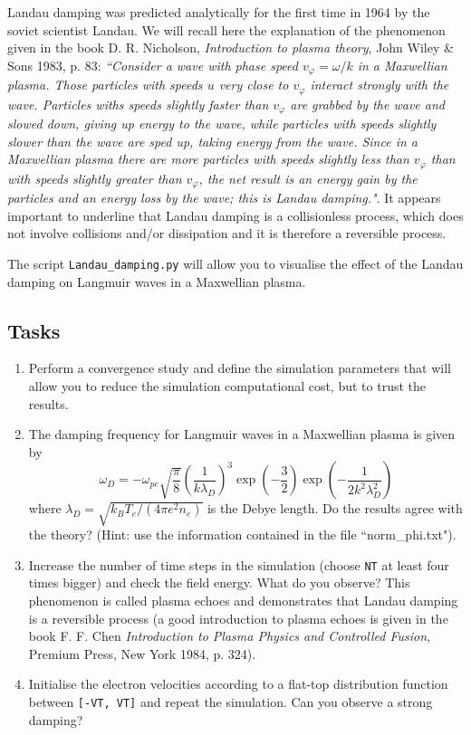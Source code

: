 \documentclass[]{exam}
\begin{document}
Landau damping was predicted analytically for the first time in 1964 by the soviet scientist Landau. We will recall here the explanation of the phenomenon given in the book D. R. Nicholson, \textit{Introduction to plasma theory}, John Wiley \& Sons 1983, p. 83: \textit{``Consider a wave with phase speed $v_{\varphi}=\omega/k$ in a Maxwellian plasma. Those particles with speeds $u$ very close to $v_{\varphi}$ interact strongly with the wave. Particles withs speeds slightly faster than $v_{\varphi}$ are grabbed by the wave and slowed down, giving up energy to the wave, while particles with speeds slightly slower than the wave are sped up, taking energy from the wave. Since in a Maxwellian plasma there are more particles with speeds slightly less than $v_{\varphi}$ than with speeds slightly greater than $v_{\varphi}$, the net result is an energy gain by the particles and an energy loss by the wave; this is Landau damping."}. It appears important to underline that Landau damping is a collisionless process, which does not involve collisions and/or dissipation and it is therefore a reversible process.

The script \texttt{Landau_damping.py} will allow you to visualise the effect of the Landau damping on Langmuir waves in a Maxwellian plasma.

\subsection{Tasks}

\begin{enumerate}

\item Perform a convergence study and define the simulation parameters that will allow you to reduce the simulation computational cost, but to trust the results.

\item The damping frequency for Langmuir waves in a Maxwellian plasma is given by
\begin{equation}
\omega_D = -\omega_{pe}\sqrt{\frac{\pi}{8}} \left(\frac{1}{k \lambda_D}\right)^3 \exp \left(-\frac{3}{2} \right) \exp \left(-\frac{1}{2k^2 \lambda_D^2} \right)
\end{equation}
where $\lambda_D=\sqrt{k_B T_e/\left(4 \pi e^2 n_e \right)}$  is the Debye length. Do the results agree with the theory? (Hint: use the information contained in the file ``norm_phi.txt").

\item Increase the number of time steps in the simulation (choose \texttt{NT} at least four times bigger) and check the field energy. What do you observe? This phenomenon is called plasma echoes and demonstrates that Landau damping is a reversible process (a good introduction to plasma echoes is given in the book F. F. Chen \textit{Introduction to Plasma Physics and Controlled Fusion}, Premium Press, New York 1984, p. 324). 

\item Initialise the electron velocities according to a flat-top distribution function between \texttt{[-VT, VT]} and repeat the simulation. Can you observe a strong damping?

\end{enumerate}
\end{document}
